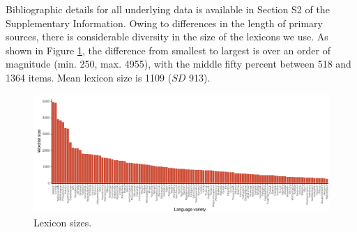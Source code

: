 Bibliographic details for all underlying data is available in Section S2 of the Supplementary Information. Owing to differences in the length of primary sources, there is considerable diversity in the size of the lexicons we use. As shown in Figure \ref{fig:lex-size}, the difference from smallest to largest is over an order of magnitude (min. 250, max. 4955), with the middle fifty percent between 518 and 1364 items. Mean lexicon size is 1109 (\(SD\) 913).

\begin{figure}[tbp]

{\centering \includegraphics[width=1\linewidth]{05-phylo-signal/fig/wordlist_sizes} 

}

\caption[Lexicon sizes]{Lexicon sizes.}\label{fig:lex-size}
\end{figure}

